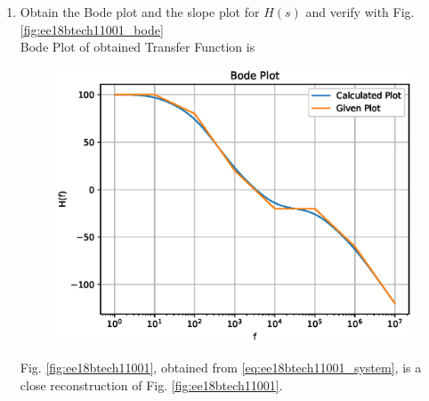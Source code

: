 \begin{enumerate}[label=\thesection.\arabic*.,ref=\thesection.\theenumi]

\item Obtain the Bode plot and the slope plot for $H(s)$ and verify with  Fig. \ref{fig:ee18btech11001_bode}
\\
\solution Bode Plot of obtained Transfer Function is 
\begin{figure}[htp]
    \centering
    \includegraphics[width=\columnwidth]{./figs/ee18btech11001/ee18btech11001_2.eps}
    \caption{}
    \label{fig:ee18btech11001_2}
\end{figure}
%
Fig. \ref{fig:ee18btech11001}, obtained from  \eqref{eq:ee18btech11001_system},
is a close reconstruction of Fig. \ref{fig:ee18btech11001}.
\end{enumerate}


